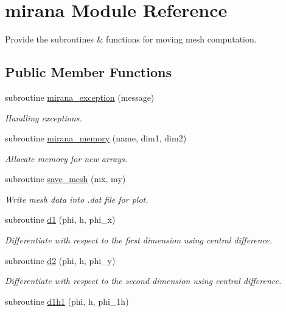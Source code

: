 \hypertarget{classmirana}{\section{mirana Module Reference}
\label{classmirana}
}


Provide the subroutines \& functions for moving mesh computation.  


\subsection*{Public Member Functions}
\begin{DoxyCompactItemize}
\item 
subroutine \hyperlink{classmirana_ab002a22665f70b4c65bdcf70ac96d768}{mirana\-\_\-exception} (message)
\begin{DoxyCompactList}\small\item\em Handling exceptions. \end{DoxyCompactList}\item 
subroutine \hyperlink{classmirana_acccf612b21e3e65bd3a78131c48afe2b}{mirana\-\_\-memory} (name, dim1, dim2)
\begin{DoxyCompactList}\small\item\em Allocate memory for new arrays. \end{DoxyCompactList}\item 
subroutine \hyperlink{classmirana_a9cbee1a318e5e828590c9ccaa51c8472}{save\-\_\-mesh} (mx, my)
\begin{DoxyCompactList}\small\item\em Write mesh data into .dat file for plot. \end{DoxyCompactList}\item 
subroutine \hyperlink{classmirana_a4009036e8b04ac992641e36d34ab0ed4}{d1} (phi, h, phi\-\_\-x)
\begin{DoxyCompactList}\small\item\em Differentiate with respect to the first dimension using central difference. \end{DoxyCompactList}\item 
subroutine \hyperlink{classmirana_a21348ffe170eafc6fc2a009256b1b6e3}{d2} (phi, h, phi\-\_\-y)
\begin{DoxyCompactList}\small\item\em Differentiate with respect to the second dimension using central difference. \end{DoxyCompactList}\item 
subroutine \hyperlink{classmirana_acc84c99770972f6328e89ac04ac67153}{d1h1} (phi, h, phi\-\_\-1h)

\end{DoxyCompactItemize}
